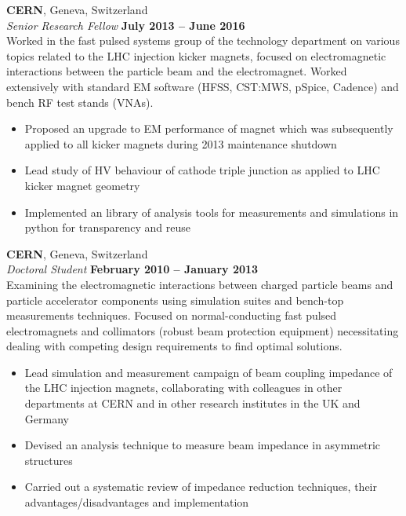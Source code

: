 \documentclass[margin,line]{resume}
\begin{document}
\begin{resume}
    \textbf{CERN}, Geneva, Switzerland \vspace{2mm}\\\vspace{1mm}%
    \textsl{Senior Research Fellow} \hfill \textbf{July 2013 -- June 2016}\\
    Worked in the fast pulsed systems group of the technology department on various topics related to the LHC injection kicker magnets, focused on electromagnetic interactions between the particle beam and the electromagnet. Worked extensively with standard EM software (HFSS, CST:MWS, pSpice, Cadence) and bench RF test stands (VNAs).
    \begin{itemize}
    \item{Proposed an upgrade to EM performance of magnet which was subsequently applied to all kicker magnets during 2013 maintenance shutdown}
    \item{Lead study of HV behaviour of cathode triple junction as applied to LHC kicker magnet geometry}
    \item{Implemented an library of analysis tools for measurements and simulations in python for transparency and reuse}
    \end{itemize}

    \textbf{CERN}, Geneva, Switzerland \vspace{2mm}\\\vspace{1mm}%
    \textsl{Doctoral Student} \hfill \textbf{February 2010 -- January 2013}\\
    Examining the electromagnetic interactions between charged particle beams and particle accelerator components using simulation suites and bench-top measurements techniques. Focused on normal-conducting fast pulsed electromagnets and collimators (robust beam protection equipment) necessitating dealing with competing design requirements to find optimal solutions. 
    \begin{itemize}
    \item{Lead simulation and measurement campaign of beam coupling impedance of the LHC injection magnets, collaborating with colleagues in other departments at CERN and in other research institutes in the UK and Germany}
    \item{Devised an analysis technique to measure beam impedance in asymmetric structures}
    \item{Carried out a systematic review of impedance reduction techniques, their advantages/disadvantages and implementation}
    \end{itemize}


\end{resume}
\end{document}
